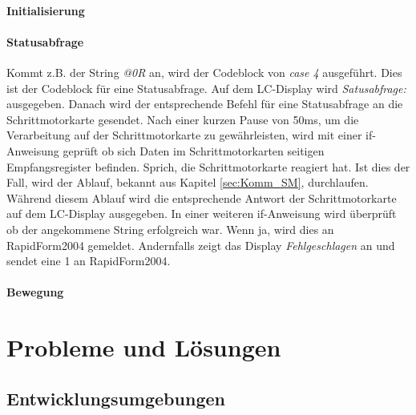 \subsubsection{Initialisierung}

\subsubsection{Statusabfrage}
Kommt z.B. der String \emph{@0R} an, wird der Codeblock von \emph{case 4} ausgeführt. Dies ist der Codeblock für eine Statusabfrage. Auf dem LC-Display wird \emph{Satusabfrage:} ausgegeben. Danach wird der entsprechende Befehl für eine Statusabfrage an die Schrittmotorkarte gesendet. Nach einer kurzen Pause von 50ms, um die Verarbeitung auf der Schrittmotorkarte zu gewährleisten, wird mit einer if-Anweisung geprüft ob sich Daten im Schrittmotorkarten seitigen Empfangsregister befinden. Sprich, die Schrittmotorkarte reagiert hat. Ist dies der Fall, wird der Ablauf, bekannt aus Kapitel \ref{sec:Komm_SM}, durchlaufen. Während diesem Ablauf wird die entsprechende Antwort der Schrittmotorkarte auf dem LC-Display ausgegeben. In einer weiteren if-Anweisung wird überprüft ob der angekommene String erfolgreich war. Wenn ja, wird dies an RapidForm2004 gemeldet. Andernfalls zeigt das Display \emph{Fehlgeschlagen} an und sendet eine 1 an RapidForm2004.\\


\subsubsection{Bewegung}

\lstset{language=C, basicstyle=\footnotesize, showstringspaces=false, tabsize=8}





\chapter{Probleme und Lösungen}
\section{Entwicklungsumgebungen}
